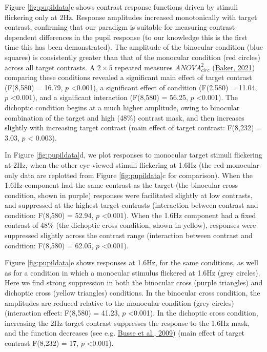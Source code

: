 \documentclass[
]{article}
\begin{document}
Figure \ref{fig:pupildata}c shows contrast response functions driven by stimuli flickering only at 2Hz. Response amplitudes increased monotonically with target contrast, confirming that our paradigm is suitable for measuring contrast-dependent differences in the pupil response (to our knowledge this is the first time this has been demonstrated). The amplitude of the binocular condition (blue squares) is consistently greater than that of the monocular condition (red circles) across all target contrasts. A \(2\times5\) repeated measures \(ANOVA^2_{circ}\) (\protect\hyperlink{ref-Baker2021}{Baker, 2021}) comparing these conditions revealed a significant main effect of target contrast (F(8,580) = 16.79, \(p\) \textless0.001), a significant effect of condition (F(2,580) = 11.04, \(p\) \textless0.001), and a significant interaction (F(8,580) = 56.25, \(p\) \textless0.001). The dichoptic condition begins at a much higher amplitude, owing to binocular combination of the target and high (48\%) contrast mask, and then increases slightly with increasing target contrast (main effect of target contrast: F(8,232) = 3.03, \(p\) \textless{} 0.003).

In Figure \ref{fig:pupildata}d, we plot responses to monocular target stimuli flickering at 2Hz, when the other eye viewed stimuli flickering at 1.6Hz (the red monocular-only data are replotted from Figure \ref{fig:pupildata}c for comparison). When the 1.6Hz component had the same contrast as the target (the binocular cross condition, shown in purple) responses were facilitated slightly at low contrasts, and suppressed at the highest target contrasts (interaction between contrast and condition: F(8,580) = 52.94, \(p\) \textless0.001). When the 1.6Hz component had a fixed contrast of 48\% (the dichoptic cross condition, shown in yellow), responses were suppressed slightly across the contrast range (interaction between contrast and condition: F(8,580) = 62.05, \(p\) \textless0.001).

Figure \ref{fig:pupildata}e shows responses at 1.6Hz, for the same conditions, as well as for a condition in which a monocular stimulus flickered at 1.6Hz (grey circles). Here we find strong suppression in both the binocular cross (purple triangles) and dichoptic cross (yellow triangles) conditions. In the binocular cross condition, the amplitudes are reduced relative to the monocular condition (grey circles) (interaction effect: F(8,580) = 41.23, \(p\) \textless0.001). In the dichoptic cross condition, increasing the 2Hz target contrast suppresses the response to the 1.6Hz mask, and the function decreases (see e.g. \protect\hyperlink{ref-Busse2009}{Busse et al., 2009}) (main effect of target contrast F(8,232) = 17, \(p\) \textless0.001).
\end{document}
